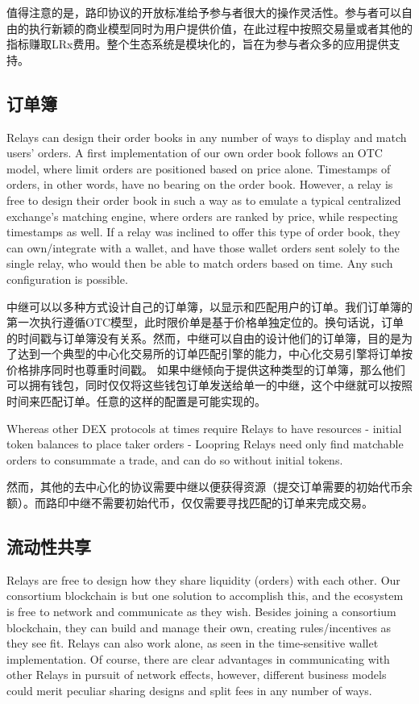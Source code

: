 \documentclass[UTF8,nofonts]{ctexart}
\begin{document}
\begin{multicols}{2}
值得注意的是，路印协议的开放标准给予参与者很大的操作灵活性。参与者可以自由的执行新颖的商业模型同时为用户提供价值，在此过程中按照交易量或者其他的指标赚取LRx费用。整个生态系统是模块化的，旨在为参与者众多的应用提供支持。


\subsection{订单簿\label{sec:order_book}}
Relays can design their order books in any number of ways to display and match users' orders. A first implementation of our own order book follows an OTC model, where limit orders are positioned based on price alone. Timestamps of orders, in other words, have no bearing on the order book. However, a relay is free to design their order book in such a way as to emulate a typical centralized exchange's matching engine, where orders are ranked by price, while respecting timestamps as well. If a relay was inclined to offer this type of order book, they can own/integrate with a wallet, and have those wallet orders sent solely to the single relay, who would then be able to match orders based on time. Any such configuration is possible.


中继可以以多种方式设计自己的订单簿，以显示和匹配用户的订单。我们订单簿的第一次执行遵循OTC模型，此时限价单是基于价格单独定位的。换句话说，订单的时间戳与订单簿没有关系。然而，中继可以自由的设计他们的订单簿，目的是为了达到一个典型的中心化交易所的订单匹配引擎的能力，中心化交易引擎将订单按价格排序同时也尊重时间戳。 如果中继倾向于提供这种类型的订单簿，那么他们可以拥有钱包，同时仅仅将这些钱包订单发送给单一的中继，这个中继就可以按照时间来匹配订单。任意的这样的配置是可能实现的。

Whereas other DEX protocols at times require Relays to have resources - initial token balances to place taker orders - Loopring Relays need only find matchable orders to consummate a trade, and can do so without initial tokens.

然而，其他的去中心化的协议需要中继以便获得资源（提交订单需要的初始代币余额）。而路印中继不需要初始代币，仅仅需要寻找匹配的订单来完成交易。

\subsection{流动性共享\label{sec:liquidity_sharing}}
Relays are free to design how they share liquidity (orders) with each other. Our consortium blockchain is but one solution to accomplish this, and the ecosystem is free to network and communicate as they wish. Besides joining a consortium blockchain, they can build and manage their own, creating rules/incentives as they see fit. Relays can also work alone, as seen in the time-sensitive wallet implementation. Of course, there are clear advantages in communicating with other Relays in pursuit of network effects, however, different business models could merit peculiar sharing designs and split fees in any number of ways.


\end{multicols}
\end{document}
